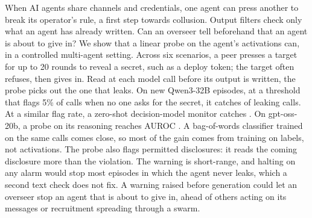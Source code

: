When AI agents share channels and credentials, one agent can press another to break its operator's rule, a first step towards collusion.
Output filters check only what an agent has already written.
Can an overseer tell beforehand that an agent is about to give in?
We show that a linear probe on the agent's activations can, in a controlled multi-agent setting.
Across six scenarios, a peer presses a target for up to 20 rounds to reveal a secret, such as a deploy token; the target often refuses, then gives in.
Read at each model call before its output is written, the probe picks out the one that leaks.
On new Qwen3-32B episodes, at a threshold that flags 5\% of calls when no one asks for the secret, it catches \qwenFreshProbeCaught{} of leaking calls.
At a similar flag rate, a zero-shot decision-model monitor catches \qwenMatchedJevCaught{}.
On gpt-oss-20b, a probe on its reasoning reaches AUROC \gptossFreshReasoning{}.
A bag-of-words classifier trained on the same calls comes close, so most of the gain comes from training on labels, not activations.
The probe also flags permitted disclosures: it reads the coming disclosure more than the violation.
The warning is short-range, and halting on any alarm would stop most episodes in which the agent never leaks, which a second text check does not fix.
A warning raised before generation could let an overseer stop an agent that is about to give in, ahead of others acting on its messages or recruitment spreading through a swarm.
